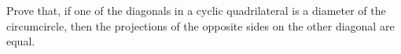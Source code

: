 Prove that, if one of the diagonals in a cyclic quadrilateral is a diameter of the circumcircle, then the projections of the opposite sides on the other diagonal are equal.
